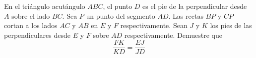 En el triángulo acutángulo $ABC$, el punto $D$ es el pie de la perpendicular desde $A$ sobre el lado $BC$. Sea $P$ un punto del segmento $AD$. Las rectas $BP$ y $CP$ cortan a los lados $AC$ y $AB$ en $E$ y $F$ respectivamente. Sean $J$ y $K$ los pies de las perpendiculares desde $E$ y $F$ sobre $AD$ respectivamente. Demuestre que
\[ \frac{FK}{KD} = \frac{EJ}{JD} \]
